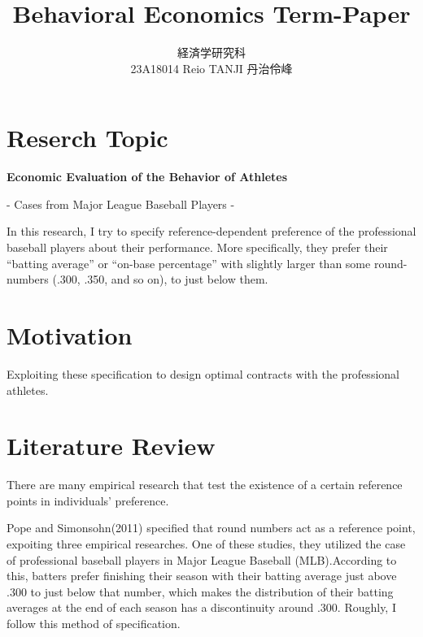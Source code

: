\documentclass{jsarticle}[12pt]
\begin{document}
\title{Behavioral Economics Term-Paper}
\author{経済学研究科　 \\ 23A18014 Reio TANJI 丹治伶峰}
\date{}
\maketitle

\section{Reserch Topic}

\Large

\textbf{Economic Evaluation of the Behavior of Athletes}

\hspace{5zw}- Cases from Major League Baseball Players -

\large

\vspace{1zw}

\hspace{1zw}In this research, I try to specify reference-dependent preference of the professional baseball players about their performance. More specifically, they prefer their ``batting average'' or ``on-base percentage'' with slightly larger than some round-numbers (.300, .350, and so on), to just below them.

\section{Motivation}

Exploiting these specification to design optimal contracts with the professional athletes.

\section{Literature Review}

\hspace{1zw} There are many empirical research that test the existence of a certain reference points in individuals' preference.

\hspace{1zw} Pope and Simonsohn(2011) specified that round numbers act as a reference point, expoiting three empirical researches. One of these studies, they utilized the case of professional baseball players in Major League Baseball (MLB).According to this, batters prefer finishing their season with their batting average just above .300 to just below that number, which makes the distribution of their batting averages at the end of each season has a discontinuity around .300. Roughly, I follow this method of specification.
\end{document}
